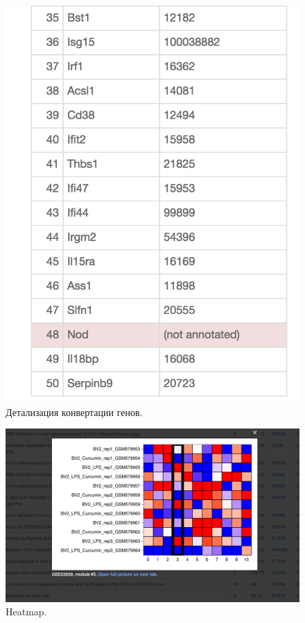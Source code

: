 \documentclass[10pt,pdf,utf8,russian,aspectratio=169]{beamer}
\begin{document}
\begin{frame}
    \begin{figure}[p]
        \centering
        \caption{Детализация конвертации генов.}
        \includegraphics[height=0.9\textheight]{./img/screen_details.png}
    \end{figure}
\end{frame}

\begin{frame}
    \begin{figure}[p]
        \centering
        \caption{Heatmap.}
        \includegraphics[height=0.9\textheight]{./img/screen_heat.png}
    \end{figure}
\end{frame}
\end{document}
